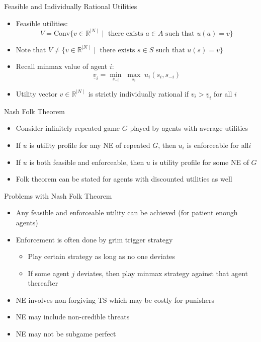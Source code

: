 \documentclass[11pt,aspectratio=169,handout]{beamer}
\begin{document}
  \begin{frame}{Feasible and Individually Rational Utilities}
   \begin{itemize}[<+->]
   \setlength{\itemsep}{1.2em}
    \item \alert{Feasible utilities}: 
    $$V = \text{Conv}\{ v \in  \mathbb{R}^{\mid N \mid} \mid \text{ there exists } a \in A \text{ such that } u(a) = v \}$$
    \item Note that $V \neq  \{ v \in  \mathbb{R} ^{\mid N \mid}  \mid \text{ there exists } s \in S \text{ such that } u (s) = v \}$
    \item Recall \alert{minmax value} of agent $i$: 
    $$\underline{v}_i = \underset{s_{-i}}{\min} \; \underset{s_{i}}{\max} \; u_{i}(s_i,s_{-i})$$
    \item Utility vector  $ v \in  \mathbb{R} ^{\mid N \mid}$  is \alert{strictly individually rational} if $v_{i}  > \underline{v}_i$ for all $i$   
   \end{itemize}
  \end{frame}
  
  
  \begin{frame}{Nash Folk Theorem}
   \begin{itemize}[<+->]
   \setlength{\itemsep}{1.2em}
    \item Consider infinitely repeated game $G$ played by agents with \alert{average utilities}
    \item If $u$ is utility profile for any NE of repeated $G$, then $u_i$ is enforceable for all$i$
    \item If $u$ is both feasible and enforceable, then $u$ is utility profile for some NE of $G$
    \item Folk theorem can be stated for agents with discounted utilities as well
   \end{itemize}
  \end{frame}
  
  
  \begin{frame}{Problems with Nash Folk Theorem}
   \begin{itemize}[<+->]
    \setlength{\itemsep}{1em}
    \item Any feasible and enforceable utility can be achieved (for \alert{patient enough} agents)
    \item Enforcement is often done by grim trigger strategy
    \begin{itemize}
     \item Play certain strategy as long as no one deviates
     \item If some agent $j$  deviates, then play minmax strategy against that agent thereafter
    \end{itemize}
    \item NE involves non-forgiving TS which may be costly for punishers
    \item NE may include \alert{non-credible threats}
    \item NE may not be subgame perfect
   \end{itemize}
  \end{frame}
  
\end{document}
